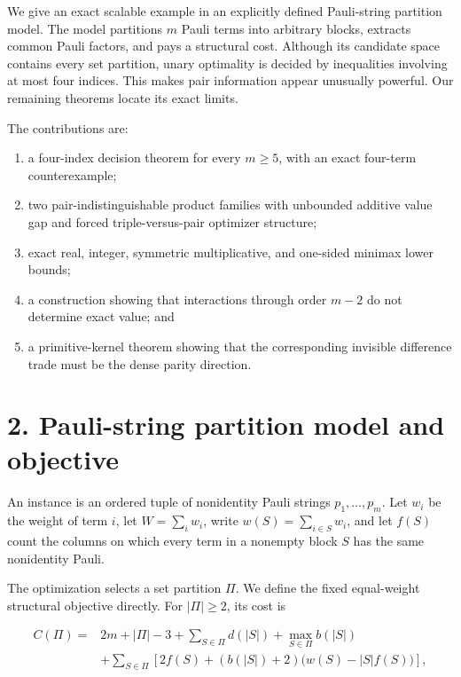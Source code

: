 \documentclass[
  11pt,
]{article}
\providecommand{\tightlist}{%
  \setlength{\itemsep}{0pt}\setlength{\parskip}{0pt}}
\begin{document}
We give an exact scalable example in an explicitly defined Pauli-string
partition model. The model partitions \(m\) Pauli terms into arbitrary
blocks, extracts common Pauli factors, and pays a structural cost.
Although its candidate space contains every set partition, unary
optimality is decided by inequalities involving at most four indices.
This makes pair information appear unusually powerful. Our remaining
theorems locate its exact limits.

The contributions are:

\begin{enumerate}
\def\labelenumi{\arabic{enumi}.}
\tightlist
\item
  a four-index decision theorem for every \(m\ge5\), with an exact
  four-term counterexample;
\item
  two pair-indistinguishable product families with unbounded additive
  value gap and forced triple-versus-pair optimizer structure;
\item
  exact real, integer, symmetric multiplicative, and one-sided minimax
  lower bounds;
\item
  a construction showing that interactions through order \(m-2\) do not
  determine exact value; and
\item
  a primitive-kernel theorem showing that the corresponding invisible
  difference trade must be the dense parity direction.
\end{enumerate}

\hypertarget{pauli-string-partition-model-and-objective}{%
\section{2. Pauli-string partition model and
objective}\label{pauli-string-partition-model-and-objective}}

An instance is an ordered tuple of nonidentity Pauli strings
\(p_1, \ldots, p_m\). Let \(w_i\) be the weight of term \(i\), let
\(W=\sum_iw_i\), write \(w(S)=\sum_{i\in S}w_i\), and let \(f(S)\) count
the columns on which every term in a nonempty block \(S\) has the same
nonidentity Pauli.

The optimization selects a set partition \(\Pi\). We define the fixed
equal-weight structural objective directly. For \(|\Pi|\ge2\), its cost
is

\[
\begin{aligned}
C(\Pi)={}&2m+|\Pi|-3+\sum_{S\in\Pi}d(|S|)
+\max_{S\in\Pi}b(|S|)\\
&+\sum_{S\in\Pi}\left[2f(S)+(b(|S|)+2)
\bigl(w(S)-|S|f(S)\bigr)\right],
\end{aligned}
\]
\end{document}
